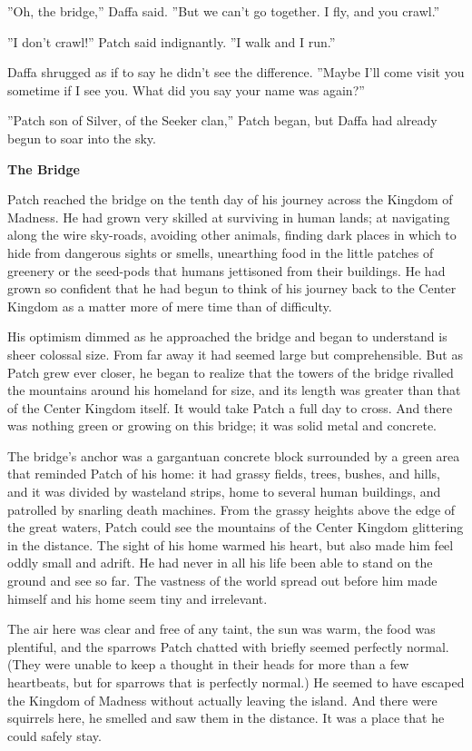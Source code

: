 \documentclass[11pt]{article}
\begin{document}
 ''Oh, the bridge,'' Daffa said. ''But we can't go together. I fly, and you crawl.''\par
 ''I don't crawl!'' Patch said indignantly. ''I walk and I run.''\par
 Daffa shrugged as if to say he didn't see the difference. ''Maybe I'll come visit you sometime if I see you. What did you say your name was again?''\par
 ''Patch son of Silver, of the Seeker clan,'' Patch began, but Daffa had already begun to soar into the sky.\par
\par
{\bf The Bridge\par
}\par
 Patch reached the bridge on the tenth day of his journey across the Kingdom of Madness. He had grown very skilled at surviving in human lands; at navigating along the wire sky-roads, avoiding other animals, finding dark places in which to hide from dangerous sights or smells, unearthing food in the little patches of greenery or the seed-pods that humans jettisoned from their buildings. He had grown so confident that he had begun to think of his journey back to the Center Kingdom as a matter more of mere time than of difficulty.\par
 His optimism dimmed as he approached the bridge and began to understand is sheer colossal size. From far away it had seemed large but comprehensible. But as Patch grew ever closer, he began to realize that the towers of the bridge rivalled the mountains around his homeland for size, and its length was greater than that of the Center Kingdom itself. It would take Patch a full day to cross. And there was nothing green or growing on this bridge; it was solid metal and concrete.\par
 The bridge's anchor was a gargantuan concrete block surrounded by a green area that reminded Patch of his home: it had grassy fields, trees, bushes, and hills, and it was divided by wasteland strips, home to several human buildings, and patrolled by snarling death machines. From the grassy heights above the edge of the great waters, Patch could see the mountains of the Center Kingdom glittering in the distance. The sight of his home warmed his heart, but also made him feel oddly small and adrift. He had never in all his life been able to stand on the ground and see so far. The vastness of the world spread out before him made himself and his home seem tiny and irrelevant.\par
 The air here was clear and free of any taint, the sun was warm, the food was plentiful, and the sparrows Patch chatted with briefly seemed perfectly normal. (They were unable to keep a thought in their heads for more than a few heartbeats, but for sparrows that is perfectly normal.) He seemed to have escaped the Kingdom of Madness without actually leaving the island. And there were squirrels here, he smelled and saw them in the distance. It was a place that he could safely stay.\par
\end{document}
